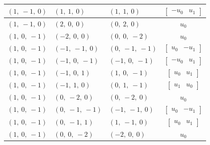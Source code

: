 \documentclass[11pt]{article}
\theoremstyle{definition}
\begin{document}
\begin{longtable}{|l|l|l|c|}
    \hline
    $\left( 1, \  -1, \  0\right)$ & $\left( 1, \  1, \  0\right)$ & $\left( 1, \  1, \  0\right)$ & $\left[\begin{matrix}- u_{0} & u_{1}\end{matrix}\right]$ \\
    \hline
    $\left( 1, \  -1, \  0\right)$ & $\left( 2, \  0, \  0\right)$ & $\left( 0, \  2, \  0\right)$ & $u_{0}$ \\
    \hline
    $\left( 1, \  0, \  -1\right)$ & $\left( -2, \  0, \  0\right)$ & $\left( 0, \  0, \  -2\right)$ & $u_{0}$ \\
    \hline
    $\left( 1, \  0, \  -1\right)$ & $\left( -1, \  -1, \  0\right)$ & $\left( 0, \  -1, \  -1\right)$ & $\left[\begin{matrix}u_{0} & - u_{1}\end{matrix}\right]$ \\
    \hline
    $\left( 1, \  0, \  -1\right)$ & $\left( -1, \  0, \  -1\right)$ & $\left( -1, \  0, \  -1\right)$ & $\left[\begin{matrix}- u_{0} & u_{1}\end{matrix}\right]$ \\
    \hline
    $\left( 1, \  0, \  -1\right)$ & $\left( -1, \  0, \  1\right)$ & $\left( 1, \  0, \  -1\right)$ & $\left[\begin{matrix}u_{0} & u_{1}\end{matrix}\right]$ \\
    \hline
    $\left( 1, \  0, \  -1\right)$ & $\left( -1, \  1, \  0\right)$ & $\left( 0, \  1, \  -1\right)$ & $\left[\begin{matrix}u_{1} & u_{0}\end{matrix}\right]$ \\
    \hline
    $\left( 1, \  0, \  -1\right)$ & $\left( 0, \  -2, \  0\right)$ & $\left( 0, \  -2, \  0\right)$ & $u_{0}$ \\
    \hline
    $\left( 1, \  0, \  -1\right)$ & $\left( 0, \  -1, \  -1\right)$ & $\left( -1, \  -1, \  0\right)$ & $\left[\begin{matrix}u_{0} & - u_{1}\end{matrix}\right]$ \\
    \hline
    $\left( 1, \  0, \  -1\right)$ & $\left( 0, \  -1, \  1\right)$ & $\left( 1, \  -1, \  0\right)$ & $\left[\begin{matrix}u_{0} & u_{1}\end{matrix}\right]$ \\
    \hline
    $\left( 1, \  0, \  -1\right)$ & $\left( 0, \  0, \  -2\right)$ & $\left( -2, \  0, \  0\right)$ & $u_{0}$ \\

\end{longtable}
\end{document}
